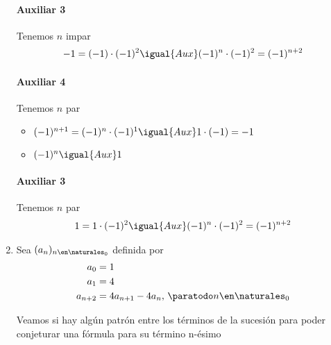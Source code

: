 \begin{enumerate}[label=\roman*)]
        \paragraph{Auxiliar 3}{
          Tenemos $n$ impar
          \begin{align*}
            -1 = (-1) \cdot (-1)^2 \igual{Aux} (-1)^n \cdot (-1)^2 = (-1)^{n+2}
          \end{align*}
        }

        \paragraph{Auxiliar 4}{
          Tenemos $n$ par
          \begin{itemize}
            \item $(-1)^{n+1} = (-1)^n \cdot (-1)^1 \igual{Aux} 1 \cdot (-1) = -1$
            \item $(-1)^n \igual{Aux} 1$
          \end{itemize}
        }

        \paragraph{Auxiliar 3}{
          Tenemos $n$ par
          \begin{align*}
            1 = 1 \cdot (-1)^2 \igual{Aux} (-1)^n \cdot (-1)^2 = (-1)^{n+2}
          \end{align*}
        }
        
  \item 
          Sea $(a_n)_{n \en \naturales _0}$ definida por
    \setcounter{equation}{0}
    \begin{align}
        a_0 &= 1 \\
        a_1 &= 4 \\
        a_{n+2} &= 4 a_{n+1} - 4 a_n,\, \paratodo n \en \naturales _0 
    \end{align}

    Veamos si hay algún patrón entre los términos de la sucesión para poder conjeturar una fórmula para su término 
    n-ésimo


\end{enumerate}
